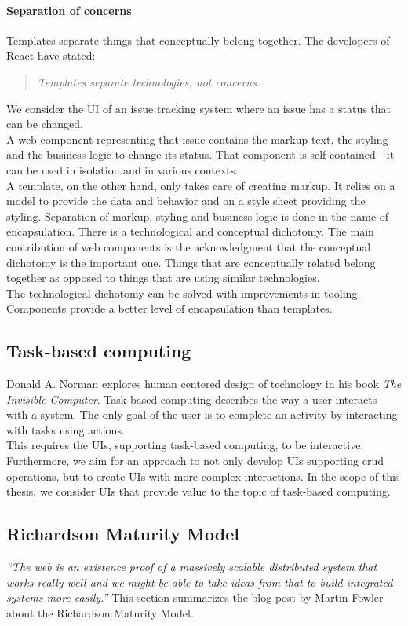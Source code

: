 \paragraph{Separation of concerns} Templates separate things that conceptually belong together. The developers of React have stated:
\begin{quote}
\textit{Templates separate technologies, not concerns.}
\end{quote}
We consider the UI of an issue tracking system where an issue has a status that can be changed. \\ A web component representing that issue contains the markup text, the styling and the business logic to change its status. That component is self-contained - it can be used in isolation and in various contexts. \\
A template, on the other hand, only takes care of creating markup. It relies on a model to provide the data and behavior and on a style sheet providing the styling.
Separation of markup, styling and business logic is done in the name of encapsulation. There is a technological and conceptual dichotomy. The main contribution of web components is the acknowledgment that the conceptual dichotomy is the important one. Things that are conceptually related belong together as opposed to things that are using similar technologies. \\
The technological dichotomy can be solved with improvements in tooling. Components provide a better level of encapsulation than templates.

\subsection{Task-based computing}
Donald A. Norman explores human centered design of technology in his book \textit{The Invisible Computer}. Task-based computing describes the way a user interacts with a system. The only goal of the user is to complete an activity by interacting with tasks using actions. \citep{invisiblecomputer} \\
This requires the UIs, supporting task-based computing, to be interactive. Furthermore, we aim for an approach to not only develop UIs supporting \gls{crud} operations, but to create UIs with more complex interactions. In the scope of this thesis, we consider UIs that provide value to the topic of task-based computing.

\subsection{Richardson Maturity Model}\label{richardsonmaturitymodel}
\textit{``The web is an existence proof of a massively scalable distributed system that works really well and we might be able to take ideas from that to build integrated systems more easily.''} \citep{richardsonmaturitymodel} This section summarizes the blog post by Martin Fowler about the Richardson Maturity Model.

